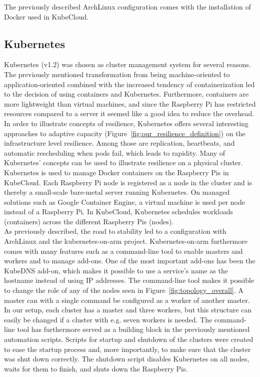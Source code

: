 \noindent The previously described ArchLinux configuration comes with the installation of Docker used in KubeCloud.

\subsection*{Kubernetes}
Kubernetes (v1.2) was chosen as cluster management system for several reasons. The previously mentioned transformation from being machine-oriented to application-oriented combined with the increased tendency of containerization led to the decision of using containers and Kubernetes. Furthermore, containers are more lightweight than virtual machines, and since the Raspberry Pi has restricted resources compared to a server it seemed like a good idea to reduce the overhead. In order to illustrate concepts of resilience, Kubernetes offers several interesting approaches to adaptive capacity (Figure~\ref{fig:our_resilience_definition}) on the infrastructure level resilience. Among those are replication, heartbeats, and automatic rescheduling when pods fail, which leads to rapidity. Many of Kubernetes' concepts can be used to illustrate resilience on a physical cluster. \\

\noindent
Kubernetes is used to manage Docker containers on the Raspberry Pis in KubeCloud. Each Raspberry Pi node is registered as a node in the cluster and is thereby a small-scale bare-metal server running Kubernetes. On managed solutions such as Google Container Engine, a virtual machine is used per node instead of a Raspberry Pi. In KubeCloud, Kubernetes schedules workloads (containers) across the different Raspberry Pis (nodes). \\

\noindent
As previously described, the road to stability led to a configuration with ArchLinux and the kubernetes-on-arm project. Kubernetes-on-arm furthermore comes with many features such as a command-line tool to enable masters and workers and to manage add-ons. One of the most important add-ons has been the KubeDNS add-on, which makes it possible to use a service's name as the hostname instead of using IP addresses. The command-line tool makes it possible to change the role of any of the nodes seen in Figure~\ref{fig:topology_overall}. A master can with a single command be configured as a worker of another master. In our setup, each cluster has a master and three workers, but this structure can easily be changed if a cluster with e.g. seven workers is needed.
The command-line tool has furthermore served as a building block in the previously mentioned automation scripts. Scripts for startup and shutdown of the clusters were created to ease the startup process and, more importantly, to make sure that the cluster was shut down correctly. The shutdown script disables Kubernetes on all nodes, waits for them to finish, and shuts down the Raspberry Pis. \\


